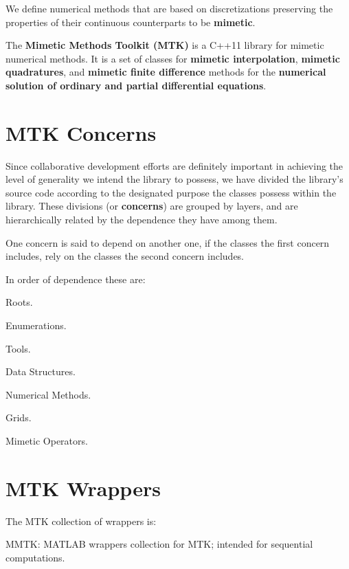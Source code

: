 We define numerical methods that are based on discretizations preserving the properties of their continuous counterparts to be {\bfseries mimetic}.

The {\bfseries Mimetic Methods Toolkit (M\+T\+K)} is a C++11 library for mimetic numerical methods. It is a set of classes for {\bfseries mimetic interpolation}, {\bfseries mimetic quadratures}, and {\bfseries mimetic finite difference} methods for the {\bfseries numerical solution of ordinary and partial differential equations}.\hypertarget{index_section_mtk_concerns}{}\section{M\+T\+K Concerns}\label{index_section_mtk_concerns}
Since collaborative development efforts are definitely important in achieving the level of generality we intend the library to possess, we have divided the library's source code according to the designated purpose the classes possess within the library. These divisions (or {\bfseries concerns}) are grouped by layers, and are hierarchically related by the dependence they have among them.

One concern is said to depend on another one, if the classes the first concern includes, rely on the classes the second concern includes.

In order of dependence these are\+:
\begin{DoxyEnumerate}
\item Roots.
\item Enumerations.
\item Tools.
\item Data Structures.
\item Numerical Methods.
\item Grids.
\item Mimetic Operators.
\end{DoxyEnumerate}\hypertarget{index_section_wrappers}{}\section{M\+T\+K Wrappers}\label{index_section_wrappers}
The M\+T\+K collection of wrappers is\+:


\begin{DoxyEnumerate}
\item M\+M\+T\+K\+: M\+A\+T\+L\+A\+B wrappers collection for M\+T\+K; intended for sequential computations.
\end{DoxyEnumerate}

